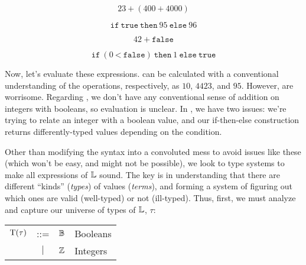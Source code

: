 \begin{equation}
      23 + (400\ \texttt{+}\ 4000)
      \label{ex:sl:s:good2}
\end{equation}

\begin{equation}
      \texttt{if}\ \texttt{true}\ \texttt{then}\ 95\ \texttt{else}\ 96
      \label{ex:sl:s:good3}
\end{equation}

\begin{equation}
      42\ \texttt{+}\ \texttt{false}
      \label{ex:sl:s:bad1}
\end{equation}

\begin{equation}
      \texttt{if}\ (0\ \texttt{<}\ \texttt{false})\ \texttt{then}\ 1\ \texttt{else}\ \texttt{true}
      \label{ex:sl:s:bad2}
\end{equation}


Now, let's evaluate these expressions.
 can be calculated with a
conventional understanding of the operations, respectively, as \(10\), \(4423\),
and \(95\). However,  are worrisome. Regarding
, we don't have any conventional sense of addition on
integers with booleans, so evaluation is unclear. In , we
have two issues: we're trying to relate an integer with a boolean value, and our
if-then-else construction returns differently-typed values depending on the
condition.


Other than modifying the syntax into a convoluted mess to avoid issues like
these (which won't be easy, and might not be possible), we look to type systems
to make all expressions of \(\mathbb{L}\) sound. The key is in understanding that
there are different ``kinds'' (\textit{types}) of values (\textit{terms}), and
forming a system of figuring out which ones are valid (well-typed) or not
(ill-typed). Thus, first, we must analyze and capture our universe of types of
\(\mathbb{L}\), \(\tau\):

\begin{longtable}{ r c c l}
      \(\mathrm{T}(\tau)\) & ::=       & \(\mathbb{B}\) & Booleans \\
                     & \(\vert\) & \(\mathbb{Z}\) & Integers
\end{longtable}

